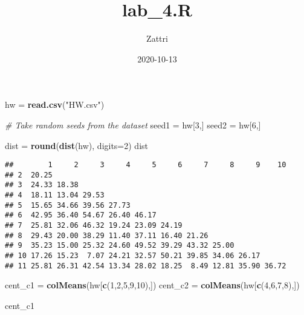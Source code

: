 \documentclass[
]{article}
\title{lab\_4.R}
\author{Zattri}
\date{2020-10-13}
\newenvironment{Shaded}{\begin{snugshade}}{\end{snugshade}}
\newcommand{\CommentTok}[1]{\textcolor[rgb]{0.56,0.35,0.01}{\textit{#1}}}
\newcommand{\DataTypeTok}[1]{\textcolor[rgb]{0.13,0.29,0.53}{#1}}
\newcommand{\DecValTok}[1]{\textcolor[rgb]{0.00,0.00,0.81}{#1}}
\newcommand{\KeywordTok}[1]{\textcolor[rgb]{0.13,0.29,0.53}{\textbf{#1}}}
\newcommand{\NormalTok}[1]{#1}
\newcommand{\StringTok}[1]{\textcolor[rgb]{0.31,0.60,0.02}{#1}}
\begin{document}
\maketitle

\begin{Shaded}
\begin{Highlighting}[]
\NormalTok{hw =}\StringTok{ }\KeywordTok{read.csv}\NormalTok{(}\StringTok{"HW.csv"}\NormalTok{)}

\CommentTok{# Take random seeds from the dataset}
\NormalTok{seed1 =}\StringTok{ }\NormalTok{hw[}\DecValTok{3}\NormalTok{,]}
\NormalTok{seed2 =}\StringTok{ }\NormalTok{hw[}\DecValTok{6}\NormalTok{,]}

\NormalTok{dist =}\StringTok{ }\KeywordTok{round}\NormalTok{(}\KeywordTok{dist}\NormalTok{(hw), }\DataTypeTok{digits=}\DecValTok{2}\NormalTok{)}
\NormalTok{dist}
\end{Highlighting}
\end{Shaded}

\begin{verbatim}
##        1     2     3     4     5     6     7     8     9    10
## 2  20.25                                                      
## 3  24.33 18.38                                                
## 4  18.11 13.04 29.53                                          
## 5  15.65 34.66 39.56 27.73                                    
## 6  42.95 36.40 54.67 26.40 46.17                              
## 7  25.81 32.06 46.32 19.24 23.09 24.19                        
## 8  29.43 20.00 38.29 11.40 37.11 16.40 21.26                  
## 9  35.23 15.00 25.32 24.60 49.52 39.29 43.32 25.00            
## 10 17.26 15.23  7.07 24.21 32.57 50.21 39.85 34.06 26.17      
## 11 25.81 26.31 42.54 13.34 28.02 18.25  8.49 12.81 35.90 36.72
\end{verbatim}

\begin{Shaded}
\begin{Highlighting}[]
\NormalTok{cent_c1 =}\StringTok{ }\KeywordTok{colMeans}\NormalTok{(hw[}\KeywordTok{c}\NormalTok{(}\DecValTok{1}\NormalTok{,}\DecValTok{2}\NormalTok{,}\DecValTok{5}\NormalTok{,}\DecValTok{9}\NormalTok{,}\DecValTok{10}\NormalTok{),])}
\NormalTok{cent_c2 =}\StringTok{ }\KeywordTok{colMeans}\NormalTok{(hw[}\KeywordTok{c}\NormalTok{(}\DecValTok{4}\NormalTok{,}\DecValTok{6}\NormalTok{,}\DecValTok{7}\NormalTok{,}\DecValTok{8}\NormalTok{),])}

\NormalTok{cent_c1}
\end{Highlighting}
\end{Shaded}
\end{document}
